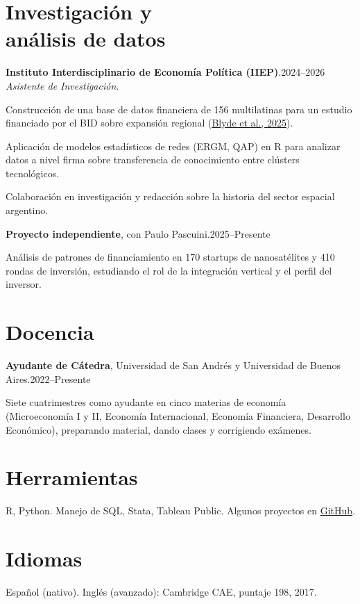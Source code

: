 \documentclass[11pt]{article}
\newcommand{\entrydate}[1]{\hfill{\small{#1}}}
\begin{document}
\section{Investigación y\\análisis de datos}
\textbf{Instituto Interdisciplinario de Economía Política (IIEP)}.\entrydate{2024--2026}\\
\textit{Asistente de Investigación.}
\begin{cvitems}
  \item Construcción de una base de datos financiera de 156 multilatinas para un estudio financiado por el BID sobre expansión regional (\href{https://publications.iadb.org/es/multilatinas-en-movimiento-caracteristicas-motivaciones-y-lineamientos-de-politica}{Blyde et al., 2025}).
  \item Aplicación de modelos estadísticos de redes (ERGM, QAP) en R para analizar datos a nivel firma sobre transferencia de conocimiento entre clústers tecnológicos.
  \item Colaboración en investigación y redacción sobre la historia del sector espacial argentino.
\end{cvitems}

\smallskip
\textbf{Proyecto independiente}, con Paulo Pascuini.\entrydate{2025--Presente}
\begin{cvitems}
  \item Análisis de patrones de financiamiento en 170 startups de nanosatélites y 410 rondas de inversión, estudiando el rol de la integración vertical y el perfil del inversor.
\end{cvitems}

\section{Docencia}
\textbf{Ayudante de Cátedra}, Universidad de San Andrés y Universidad de Buenos Aires.\entrydate{2022--Presente}
\begin{cvitems}
  \item Siete cuatrimestres como ayudante en cinco materias de economía (Microeconomía I y II, Economía Internacional, Economía Financiera, Desarrollo Económico), preparando material, dando clases y corrigiendo exámenes.
\end{cvitems}

\section{Herramientas}
    R, Python. Manejo de SQL, Stata, Tableau Public. Algunos proyectos en \href{https://www.github.com/sanarovaz/}{GitHub}.
\section{Idiomas}
Español (nativo). Inglés (avanzado): Cambridge CAE, puntaje 198, 2017.
\end{document}
